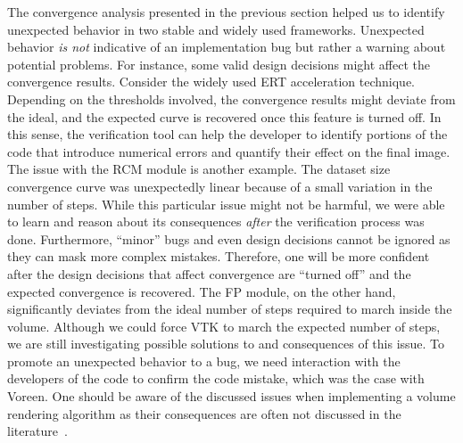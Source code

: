 The convergence analysis presented in the previous section helped us
to identify unexpected behavior in two stable and widely used
frameworks. Unexpected behavior \emph{is not} indicative of an
implementation bug but rather a warning about potential problems. For
instance, some valid design decisions might affect the convergence
results. Consider the widely used ERT acceleration
technique. Depending on the thresholds involved, the convergence
results might deviate from the ideal, and the expected curve is
recovered once this feature is turned off. In this sense, the
verification tool can help the developer to identify portions of the
code that introduce numerical errors and quantify their effect on the
final image. The issue with the RCM module is another example. The
dataset size convergence curve was unexpectedly linear because of a
small variation in the number of steps. While this particular issue
might not be harmful, we were able to learn and reason about its
consequences \emph{after} the verification process was
done. Furthermore, ``minor'' bugs and even design decisions cannot be
ignored as they can mask more complex mistakes. Therefore, one will be
more confident after the design decisions that affect convergence are
``turned off'' and the expected convergence is recovered.  The FP
module, on the other hand, significantly deviates from the ideal
number of steps required to march inside the volume. Although we could
force VTK to march the expected number of steps, we are still
investigating possible solutions to and consequences of this issue.
To promote an unexpected behavior to a bug, we need interaction with
the developers of the code to confirm the code mistake, which was the
case with Voreen.  One should be aware of the discussed issues when
implementing a volume rendering algorithm as their consequences are
often not discussed in the
literature~\cite{Real-TimeVolumeGraphics06}.

